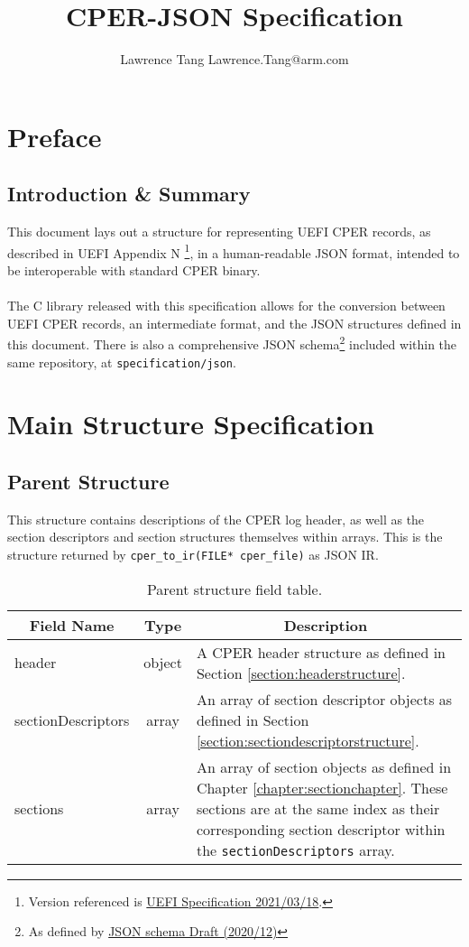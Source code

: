 \documentclass{report}
\title{CPER-JSON Specification}
\author{\parbox{\linewidth}{\centering%
Lawrence Tang\endgraf
Lawrence.Tang@arm.com\endgraf\medskip}}
\date{\parbox{\linewidth}{\centering%
Revision v0.0.1 (\today)\endgraf
First revision released [DATE].}}
\newcommand*{\thead}[1]{\multicolumn{1}{|c|}{\bfseries #1}}
\newcommand*{\jsontable}[1]{
    \begin{table}[!ht]
    \label{#1}
    \centering
    \begin{adjustbox}{center}
    \begin{tabular}{|l|c|p{8cm}|}
    \hline
    \thead{Field Name} & \thead{Type} & \thead{Description} \\
    \hline
}
\newcommand*{\jsontableend}[1]{
    \hline
    \end{tabular}
    \end{adjustbox}
    \caption{#1}
    \label{table:#1}
    \end{table}
    \FloatBarrier
}
\begin{document}
\maketitle
\tableofcontents
\listoftables

\chapter{Preface}
\section{Introduction \& Summary}
This document lays out a structure for representing UEFI CPER records, as described in UEFI Appendix N
\footnote{Version referenced is \href{https://uefi.org/sites/default/files/resources/UEFI_Spec_2_9_2021_03_18.pdf}{UEFI Specification 2021/03/18}.},
 in a human-readable JSON format, intended to be interoperable with standard CPER binary.
\\\\
The C library released with this specification allows for the conversion between UEFI CPER records, an intermediate format, and the JSON structures
defined in this document. There is also a comprehensive JSON schema\footnote{As defined by \href{https://json-schema.org/draft/2020-12/json-schema-core.html}{JSON schema Draft (2020/12)}} included within the same repository, at \texttt{specification/json}.

\chapter{Main Structure Specification}
\section{Parent Structure}
\label{section:parentstructure}
This structure contains descriptions of the CPER log header, as well as the section descriptors and
section structures themselves within arrays. This is the structure returned by \texttt{cper\_to\_ir(FILE* cper\_file)} as JSON IR.

\jsontable{table:parentstructure}
header & object & A CPER header structure as defined in Section \ref{section:headerstructure}. \\
\hline
sectionDescriptors & array & An array of section descriptor objects as defined in Section \ref{section:sectiondescriptorstructure}. \\
\hline
sections & array & An array of section objects as defined in Chapter \ref{chapter:sectionchapter}. These sections are at the same index as their corresponding section descriptor within the \texttt{sectionDescriptors} array.\\
\jsontableend{Parent structure field table.}
\end{document}
